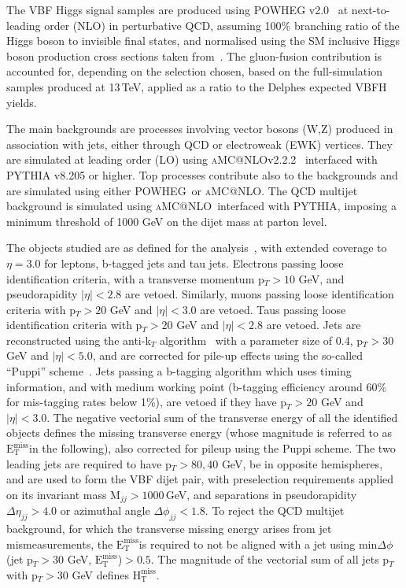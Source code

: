 \documentclass[../report.tex]{subfiles}
\makeatletter
\newcommand{\MET}{\ensuremath{\mathrm{E}_{\mathrm{T}}^{\mathrm{miss}}}}
\newcommand{\MHT}{\ensuremath{\mathrm{H}_{\mathrm{T}}^{\mathrm{miss}}}}
\newcommand{\POWHEG}{\textsc{POWHEG}}
\newcommand{\MGvATNLO}{\textsc{aMC@NLO}}
\newcommand{\PYTHIA}{\textsc{PYTHIA}}
\makeatother
\begin{document}
The VBF Higgs signal samples are produced using \POWHEG
v2.0~\cite{Alioli:2010xd,Nason:2009ai} at next-to-leading order (NLO)
in perturbative QCD, assuming 100\% branching ratio of the Higgs boson
to invisible final states, and normalised using the SM inclusive Higgs
boson production cross sections taken from~\cite{deFlorian:2016spz}. The gluon-fusion
contribution is accounted for, depending on the selection chosen,
based on the full-simulation samples produced at 13\,TeV, applied as a
ratio to the Delphes expected VBFH yields.

The main backgrounds are processes involving vector bosons (W,Z)
produced in association with jets, either through QCD or electroweak
(EWK) vertices. They are simulated at leading order (LO)
using \MGvATNLO v2.2.2~\cite{Alwall:2014hca} interfaced with \PYTHIA
v8.205 or higher. Top processes contribute also to the backgrounds and
are simulated using either \POWHEG\ or \MGvATNLO. The QCD multijet
background is simulated using \MGvATNLO\ interfaced with \PYTHIA,
imposing a minimum threshold of 1000 GeV on the dijet mass at parton
level.

The objects studied are as defined for the analysis~\cite{Sirunyan:2018owy}, with extended coverage to $\eta=3.0$
for leptons, b-tagged jets and tau jets. Electrons passing loose
identification criteria, with a transverse momentum p$_T>10$ GeV, and
pseudorapidity $|\eta|<2.8$ are vetoed. Similarly, muons passing loose
identification criteria with p$_T>20$ GeV and $|\eta|<3.0$ are
vetoed. Taus passing loose identification criteria with p$_T>20$ GeV
and $|\eta|<2.8$ are vetoed. Jets are reconstructed using the
anti-k$_T$ algorithm~\cite{Cacciari:2008gp} with a parameter size of
0.4, p$_T>30$ GeV and $|\eta|<5.0$, and are corrected for pile-up
effects using the so-called ``Puppi''
scheme~\cite{Bertolini:2014bba}. Jets passing a b-tagging algorithm
which uses timing information, and with medium working point
(b-tagging efficiency around 60\% for mis-tagging rates below 1\%),
are vetoed if they have p$_T>20$ GeV and $|\eta|<3.0$. The negative
vectorial sum of the transverse energy of all the identified objects
defines the missing transverse energy (whose magnitude is referred to
as \MET in the following), also corrected for pileup using the Puppi
scheme. The two leading jets are required to have p$_T>80,40$ GeV, be
in opposite hemispheres, and are used to form the VBF dijet pair, with
preselection requirements applied on its invariant mass M$_{jj}>1000$\,GeV, and separations
in pseudorapidity $\Delta\eta_{jj}>4.0$ or azimuthal angle
$\Delta\phi_{jj}<1.8$. To reject the QCD multijet background, for which
the transverse missing energy arises from jet mismeasurements,
the \MET is required to not be aligned with a jet using
min$\Delta\phi$(jet p$_T>30$ GeV, \MET)$>0.5$. The magnitude of the
vectorial sum of all jets p$_T$ with p$_T>30$ GeV defines \MHT.
 
\end{document}

